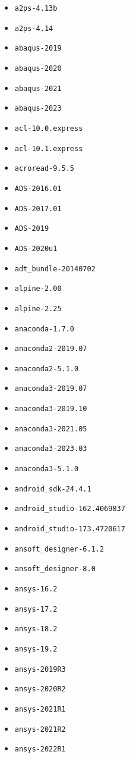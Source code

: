 \begin{itemize}
\item \verb|a2ps-4.13b|
\item \verb|a2ps-4.14|
\item \verb|abaqus-2019|
\item \verb|abaqus-2020|
\item \verb|abaqus-2021|
\item \verb|abaqus-2023|
\item \verb|acl-10.0.express|
\item \verb|acl-10.1.express|
\item \verb|acroread-9.5.5|
\item \verb|ADS-2016.01|
\item \verb|ADS-2017.01|
\item \verb|ADS-2019|
\item \verb|ADS-2020u1|
\item \verb|adt_bundle-20140702|
\item \verb|alpine-2.00|
\item \verb|alpine-2.25|
\item \verb|anaconda-1.7.0|
\item \verb|anaconda2-2019.07|
\item \verb|anaconda2-5.1.0|
\item \verb|anaconda3-2019.07|
\item \verb|anaconda3-2019.10|
\item \verb|anaconda3-2021.05|
\item \verb|anaconda3-2023.03|
\item \verb|anaconda3-5.1.0|
\item \verb|android_sdk-24.4.1|
\item \verb|android_studio-162.4069837|
\item \verb|android_studio-173.4720617|
\item \verb|ansoft_designer-6.1.2|
\item \verb|ansoft_designer-8.0|
\item \verb|ansys-16.2|
\item \verb|ansys-17.2|
\item \verb|ansys-18.2|
\item \verb|ansys-19.2|
\item \verb|ansys-2019R3|
\item \verb|ansys-2020R2|
\item \verb|ansys-2021R1|
\item \verb|ansys-2021R2|
\item \verb|ansys-2022R1|

\end{itemize}
